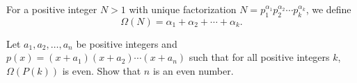 For a positive integer $N>1$ with unique factorization $N=p_1^{\alpha_1}p_2^{\alpha_2}\dotsb p_k^{\alpha_k}$,  we define\[\Omega(N)=\alpha_1+\alpha_2+\dotsb+\alpha_k.\]

Let $a_1,a_2,\dotsc, a_n$ be positive integers and $p(x)=(x+a_1)(x+a_2)\dotsb (x+a_n)$ such that for all positive integers $k$,  $\Omega(P(k))$ is even. Show that $n$ is an even number.